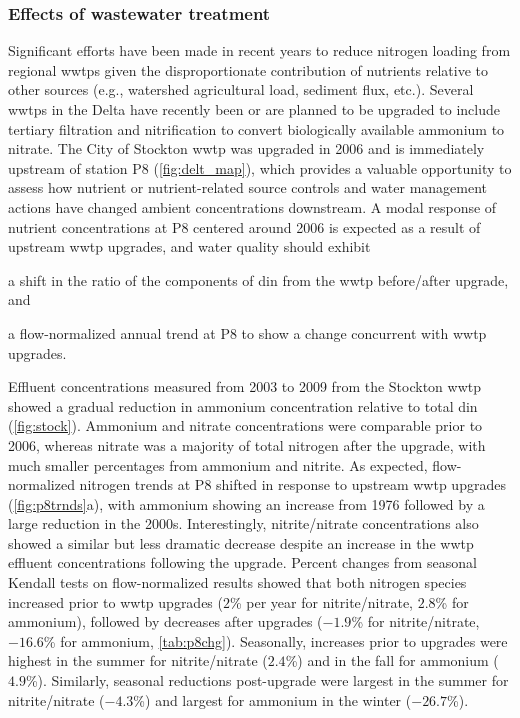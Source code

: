 \documentclass[journal = esthag, manuscript = article]{achemso}\usepackage[]{graphicx}\usepackage[]{color}
\begin{document}
\subsubsection{Effects of wastewater treatment}

Significant efforts have been made in recent years to reduce nitrogen loading from regional \acp{wwtp} given the disproportionate contribution of nutrients relative to other sources (e.g., watershed agricultural load, sediment flux, etc.)\cite{Cornwell14,Novick15}.  Several \acp{wwtp} in the Delta have recently been or are planned to be upgraded to include tertiary filtration and nitrification to convert biologically available ammonium to nitrate. The City of Stockton \ac{wwtp} was upgraded in 2006 and is immediately upstream of station P8 (\cref{fig:delt_map})\cite{Jabusch16}, which provides a valuable opportunity to assess how nutrient or nutrient-related source controls and water management actions have changed ambient concentrations downstream. A modal response of nutrient concentrations at P8 centered around 2006 is expected as a result of upstream \ac{wwtp} upgrades, and water quality should exhibit \begin{inparaenum}[1\upshape)]
\item a shift in the ratio of the components of \ac{din} from the \ac{wwtp} before/after upgrade, and
\item a flow-normalized annual trend at P8 to show a change concurrent with \ac{wwtp} upgrades.
\end{inparaenum}



Effluent concentrations measured from 2003 to 2009 from the Stockton \ac{wwtp} showed a gradual reduction in ammonium concentration relative to total \ac{din} (\cref{fig:stock}).  Ammonium and nitrate concentrations were comparable prior to 2006, whereas nitrate was a majority of total nitrogen after the upgrade, with much smaller percentages from ammonium and nitrite. As expected, flow-normalized nitrogen trends at P8 shifted in response to upstream \ac{wwtp} upgrades (\cref{fig:p8trnds}a), with ammonium showing an increase from 1976 followed by a large reduction in the 2000s.  Interestingly, nitrite/nitrate concentrations also showed a similar but less dramatic decrease despite an increase in the \ac{wwtp} effluent concentrations following the upgrade.  Percent changes from seasonal Kendall tests on flow-normalized results showed that both nitrogen species increased prior to \ac{wwtp} upgrades ($2$\% per year for nitrite/nitrate, $2.8$\% for ammonium), followed by decreases after upgrades ($-1.9$\% for nitrite/nitrate, $-16.6$\% for ammonium, \cref{tab:p8chg}).  Seasonally, increases prior to upgrades were highest in the summer for nitrite/nitrate ($2.4$\%) and in the fall for ammonium ($4.9$\%). Similarly, seasonal reductions post-upgrade were largest in the summer for nitrite/nitrate ($-4.3$\%) and largest for ammonium in the winter ($-26.7$\%).
\end{document}
